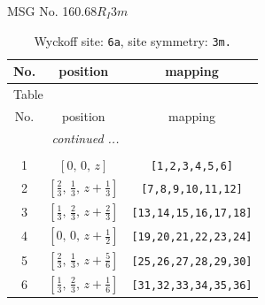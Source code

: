 \documentclass[fleqn,8pt]{jsarticle}
\begin{document}
\setcounter{MaxMatrixCols}{32}

\renewcommand{\tablename}{Table~}
\renewcommand{\figurename}{Figure~}
\begin{center}
\LARGE
MSG No. 160.68\quad$R_{I}3m$
\end{center}
\renewcommand{\arraystretch}{1.2}
\begin{longtable}{ccc}
\caption{Wyckoff site: {\tt 6a}, site symmetry: {\tt 3m.}}
 \\
 \hline \hline
No. & position & mapping \\ \hline \endfirsthead

\multicolumn{2}{l}{\tablename\ \thetable{}} \\
 \hline \hline
No. & position & mapping \\ \hline \endhead

 \hline \hline
\multicolumn{2}{r}{\footnotesize\it continued ...} \\ \endfoot

 \hline \hline
\multicolumn{2}{r}{} \\ \endlastfoot

1 & $\left[ 0,\, 0,\, z \right]$ & {\tt [1,2,3,4,5,6]} \\ \hline
2 & $\left[ \frac{2}{3},\, \frac{1}{3},\, z + \frac{1}{3} \right]$ & {\tt [7,8,9,10,11,12]} \\ \hline
3 & $\left[ \frac{1}{3},\, \frac{2}{3},\, z + \frac{2}{3} \right]$ & {\tt [13,14,15,16,17,18]} \\ \hline
4 & $\left[ 0,\, 0,\, z + \frac{1}{2} \right]$ & {\tt [19,20,21,22,23,24]} \\ \hline
5 & $\left[ \frac{2}{3},\, \frac{1}{3},\, z + \frac{5}{6} \right]$ & {\tt [25,26,27,28,29,30]} \\ \hline
6 & $\left[ \frac{1}{3},\, \frac{2}{3},\, z + \frac{1}{6} \right]$ & {\tt [31,32,33,34,35,36]} \\
\end{longtable}
\renewcommand{\arraystretch}{1.2}
\end{document}
